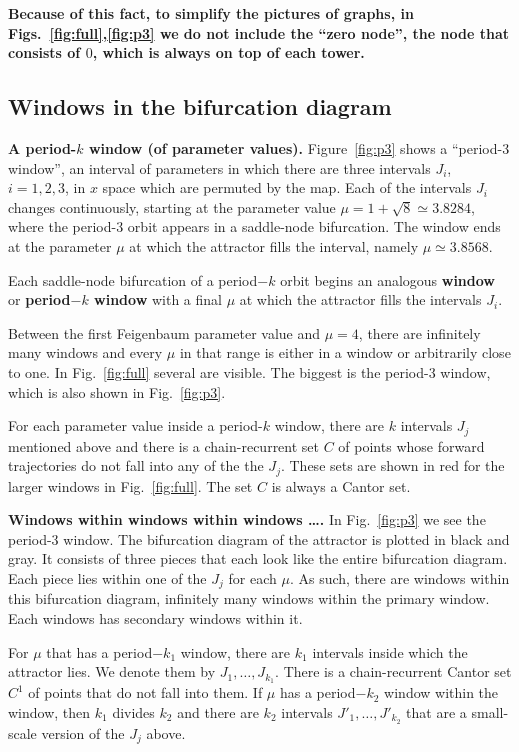 \documentclass{article}
\newcommand{\BF}{\boldmath}
\begin{document}
{\bf Because of this fact, to simplify the pictures of graphs, in Figs.~\ref{fig:full},\ref{fig:p3} we do not include the ``zero node'', the node that consists of $0$, which is always on top of each tower.}
%
\subsection{Windows in the bifurcation diagram}
\label{Windows}
%
{\bf A period-\BF$ k$ window (of parameter values).} Figure~\ref{fig:p3} shows a ``period-3 window'', an interval of parameters in which there are three intervals $J_i$, $i=1,2,3$, in $x$ space which are permuted by the map. 
Each of the intervals $J_i$ changes continuously, starting at the parameter value  $\mu=1+\sqrt{8}\simeq3.8284$, where the period-3 orbit appears in a saddle-node bifurcation. 
The window ends at the parameter $\mu$ at which the attractor fills the interval, namely $\mu\simeq3.8568$.

Each saddle-node bifurcation of a  period$-k$ orbit begins an analogous {\bf  window} or {\bf period\BF$-k$ window}
with a final $\mu$ at which the attractor fills the intervals $J_i.$

Between the first Feigenbaum parameter value and $\mu=4$, there are infinitely many windows and every $\mu$ in that range is either in a window or arbitrarily close to one. In Fig.~\ref{fig:full} several are visible. 
The biggest is the period-3 window, which is also shown in Fig.~\ref{fig:p3}.

For each parameter value inside a period-$k$ window, there are $k$ intervals $J_j$ mentioned above and there is a chain-recurrent set $C$ of points whose forward trajectories do not fall into any of the the $J_j$. 
These sets are shown in red for the larger windows in Fig.~\ref{fig:full}. The set $C$ is always a Cantor set.

{\bf Windows within windows within windows \ldots. } In Fig.~\ref{fig:p3} we see the period-3 window. 
The bifurcation diagram of the attractor is plotted in black and gray. 
It consists of three pieces that each look like the entire bifurcation diagram. 
Each piece lies within one of the $J_j$ for each $\mu$. 
As such, there are windows within this bifurcation diagram, infinitely many windows within the primary window. 
Each windows has secondary windows within it.

For $\mu$ that has a period$-k_1$ window, there are $k_1$
intervals inside which the attractor lies. We denote them by $J_1,\dots,J_{k_1}$. There is a chain-recurrent Cantor set $C^1$ of points that do not fall into them.
If $\mu$ has a period$-k_2$ window within the window, then $k_1$ divides $k_2$ and there are $k_2$ intervals $J'_1,\dots,J'_{k_2}$ that are a small-scale version of the $J_j$ above.
\end{document}

